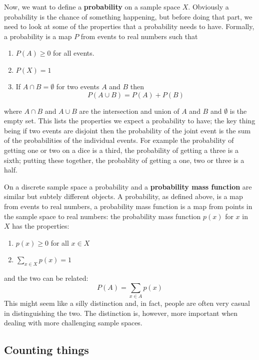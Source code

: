 \documentclass[11pt,a4paper]{scrartcl}
\begin{document}
Now, we want to define a \textbf{probability} on a sample space
$X$. Obviously a probability is the chance of something happening, but
before doing that part, we need to look at some of the properties that
a probability needs to have. Formally, a probability is a map $P$ from
events to real numbers such that
\begin{enumerate}
\item $P(A)\ge 0$ for all events.
\item $P(X)=1$
\item If $A\cap B=\emptyset$ for two events $A$ and $B$ then 
\begin{equation}
P(A\cup B)=P(A)+P(B)
\end{equation}
\end{enumerate}
where $A\cap B$ and $A\cup B$ are the intersection and union of $A$
and $B$ and $\emptyset$ is the empty set. This lists the properties we
expect a probability to have; the key thing being if two events are
disjoint then the probability of the joint event is the sum of the
probabilities of the individual events. For example the probability of
getting one or two on a dice is a third, the probability of getting a
three is a sixth; putting these together, the probablity of getting a
one, two or three is a half.


On a discrete sample space a probability and a \textbf{probability
  mass function} are similar but subtely different objects. A
probability, as defined above, is a map from events to real numbers, a
probability mass function is a map from points in the sample space to
real numbers: the probability mass function $p(x)$ for $x$ in $X$ has the properties:
\begin{enumerate}
\item $p(x)\ge 0$ for all $x\in X$
\item $\sum_{x\in X} p(x)=1$
\end{enumerate}
and the two can be related:
\begin{equation}
P(A)=\sum_{x\in A}p(x)
\end{equation}
This might seem like a silly distinction and, in fact, people are
often very casual in distinguishing the two. The distinction is,
however, more important when dealing with more challenging sample
spaces.

\subsection*{Counting things}
\end{document}
